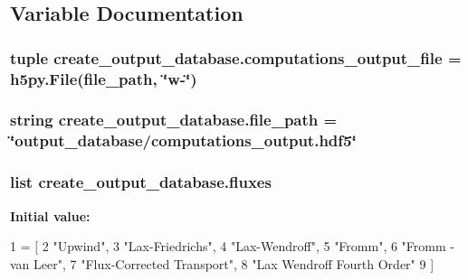 \subsection{Variable Documentation}
\hypertarget{namespacecreate__output__database_a508ee6ec63e627741c50fdc1c78fcdb9}{
\subsubsection[{computations\-\_\-output\-\_\-file}]{\setlength{\rightskip}{0pt plus 5cm}tuple create\-\_\-output\-\_\-database.\-computations\-\_\-output\-\_\-file = h5py.\-File({\bf file\-\_\-path}, \char`\"{}w-\/\char`\"{})}}\label{namespacecreate__output__database_a508ee6ec63e627741c50fdc1c78fcdb9}
\hypertarget{namespacecreate__output__database_a83d65d86db354703b78c84a953cf8a0d}{
\subsubsection[{file\-\_\-path}]{\setlength{\rightskip}{0pt plus 5cm}string create\-\_\-output\-\_\-database.\-file\-\_\-path = \char`\"{}output\-\_\-database/computations\-\_\-output.\-hdf5\char`\"{}}}\label{namespacecreate__output__database_a83d65d86db354703b78c84a953cf8a0d}
\hypertarget{namespacecreate__output__database_a9b215d5f0ee5ba41c1d1bf0392450d22}{
\subsubsection[{fluxes}]{\setlength{\rightskip}{0pt plus 5cm}list create\-\_\-output\-\_\-database.\-fluxes}}\label{namespacecreate__output__database_a9b215d5f0ee5ba41c1d1bf0392450d22}
{\bfseries Initial value\-:}
\begin{DoxyCode}
1 = [
2     \textcolor{stringliteral}{"Upwind"}, 
3     \textcolor{stringliteral}{"Lax-Friedrichs"}, 
4     \textcolor{stringliteral}{"Lax-Wendroff"}, 
5     \textcolor{stringliteral}{"Fromm"}, 
6     \textcolor{stringliteral}{"Fromm - van Leer"}, 
7     \textcolor{stringliteral}{"Flux-Corrected Transport"}, 
8     \textcolor{stringliteral}{"Lax Wendroff Fourth Order"}    
9 ]
\end{DoxyCode}
